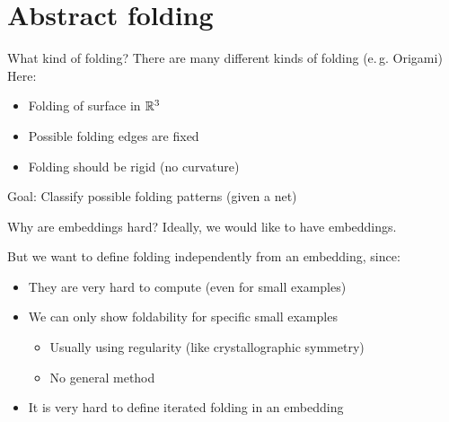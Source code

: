 \section{Abstract folding}
\frame{\tableofcontents[currentsection]}

\begin{frame}{What kind of folding?}
    \pause
    There are many different kinds of folding (e.\,g. Origami)
    \pause
    Here:
    \begin{itemize}
        \pause
        \item Folding of surface in $\mathbb{R}^3$
        \pause
        \item Possible folding edges are fixed
        \pause
        \item Folding should be rigid (no curvature)
    \end{itemize}

    \pause
    Goal: Classify possible folding patterns (given a net)

    \pause
    \begin{center}
    \end{center}

\end{frame}


\begin{frame}{Why are embeddings hard?}
    \pause
    Ideally, we would like to have embeddings.
    
    \pause
    But we want to define folding independently from an embedding, since:

    \begin{itemize}
        \pause
        \item They are very hard to compute (even for small examples)
        \pause
        \item We can only show foldability for specific small examples
            \begin{itemize}
                \pause
                \item Usually using regularity (like crystallographic symmetry)
                \pause
                \item No general method
            \end{itemize}
        \pause
        \item It is very hard to define iterated folding in an embedding
    \end{itemize}

    \pause
    \begin{center}
    \end{center}

\end{frame}

